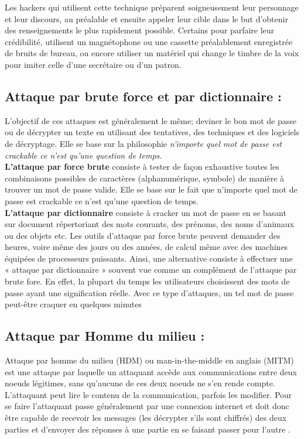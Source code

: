 Les hackers qui utilisent cette technique préparent soigneusement leur personnage et leur discours, au préalable et ensuite appeler leur cible dans le but d’obtenir des renseignements le plus rapidement possible. Certains pour parfaire leur crédibilité, utilisent un magnétophone ou une cassette préalablement enregistrée de bruits de bureau, ou encore utiliser un matériel qui change le timbre de la voix pour imiter celle d'une secrétaire ou d’un patron.

\subsection{Attaque par brute force et par dictionnaire : }
L’objectif de ces attaques est généralement le même; deviner le bon mot de passe ou de décrypter un texte en utilisant des tentatives, des techniques et des logiciels de décryptage. Elle se base sur la philosophie \textit{n’importe quel mot de passe est crackable ce n’est qu’une question de temps.}\\

\textbf{L’attaque par force brute} consiste à tester de façon exhaustive toutes les combinaisons possibles de caractères (alphanumérique, symbole) de manière à trouver un mot de passe valide. Elle se base sur le fait que n’importe quel mot de passe est crackable ce n’est qu’une question de temps.\\

\textbf{L’attaque par dictionnaire} consiste à cracker un mot de passe en se basant sur document répertoriant des mots courants, des prénoms, des noms d’animaux ou des objets etc.
Les outils d'attaque par force brute peuvent demander des heures, voire même des jours ou des années, de calcul même avec des machines équipées de processeurs puissants. Ainsi, une alternative consiste à effectuer une « attaque par dictionnaire » souvent vue comme un complément de l’attaque par brute fore. En effet, la plupart du temps les utilisateurs choisissent des mots de passe ayant une signification réelle. Avec ce type d'attaques, un tel mot de passe peut-être craquer en quelques minutes
\subsection{Attaque par Homme du milieu :}
Attaque par homme du milieu (HDM) ou man-in-the-middle en anglais (MITM) est une attaque par laquelle un attaquant accède aux communications entre deux noeuds légitimes, sans qu’aucune de ces deux noeuds ne s’en rende compte. L’attaquant peut lire le contenu de la communication, parfois les modifier.
\imgMiM
Pour se faire l’attaquant passe généralement par une connexion internet et doit donc être capable de recevoir les messages (les décrypter s’ils sont chiffrés) des deux parties et d'envoyer des réponses à une partie en se faisant passer pour l'autre \cite{ref14}.

